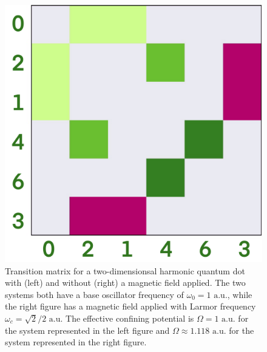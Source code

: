 \begin{figure}
\begin{center}
\begin{minipage}{0.45\textwidth}
        \includegraphics[width=\textwidth]{results/figures/dipole_yes_b.png}
    \end{minipage}        
    \end{center}
    \caption{Transition matrix for a two-dimensionsal harmonic quantum dot with (left) 
        and without (right) a magnetic field applied. The two systems both have a base oscillator 
        frequency of $\omega_0 = 1 \text{ a.u.}$, while the right figure has a magnetic field 
        applied with Larmor frequency $\omega_c = \sqrt{2}/2 \text{ a.u.}$ The effective 
        confining potential is $\Omega = 1 \text{ a.u.}$ for the system represented in the 
        left figure and $\Omega \approx 1.118 \text{ a.u.}$ for the system represented in 
        the right figure.
    }
    \label{fig:transition_yes_no_b}
\end{figure}

